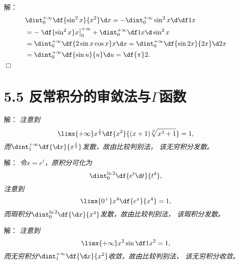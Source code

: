 \begin{frame}
	\linespread{1.5}
	
	\pause
	\small 解：\it 
	\begin{align*}
		&\dint_0^{+\infty}\df{\sin^2x}{x^2}\d x
		=-\dint_0^{+\infty}\sin^2x\d\df1x\\
		&=-\left.\df{\sin^2x}x\right|_0^{+\infty}
		+\dint_0^{+\infty}\df1x\d\sin^2x\\
		&=\dint_0^{+\infty}\df{2\sin x\cos x}x\d x
		=\dint_0^{+\infty}\df{\sin2x}{2x}\d 2x\\
		&=\dint_0^{+\infty}\df{\sin u}{u}\d u=\df{\pi}2.
	\end{align*}
	\hfill$\Box$
\end{frame}

\section{5.5 反常积分的审敛法与$\Gamma$函数}

\begin{frame}
	\linespread{1.5}
	
	\pause
	\small 解：\it 
	注意到
	$$\limx{+\infty}x^{\frac12}\df{x^2}{(x+1)\sqrt[2]{x^3+1}}=1,$$
	而$\dint_1^{+\infty}\df{\d x}{x^{\frac12}}$发散，故由比较判别法，
	该无穷积分发散。
\end{frame}

\begin{frame}
	\linespread{1.5}
	
	\pause
	\small 解：\it 
	令$x=e^t$，原积分可化为
	$$\dint_0^{\ln 2}\df{e^t\d t}{t^4},$$
	注意到
	$$\limx{0^+}x^4\df{e^x}{x^4}=1,$$
	而瑕积分$\dint_0^{\ln 2}\df{\d x}{x^4}$发散，故由比较判别法，
	该瑕积分发散。
\end{frame}

\begin{frame}
	\linespread{1.5}
	
	\pause
	\small 解：\it 
	注意到
	$$\limx{+\infty}x^2\sin\df1{x^2}=1,$$
	而无穷积分$\dint_1^{+\infty}\df{\d x}{x^2}$收敛，故由比较判别法，
	该无穷积分收敛。
\end{frame}


